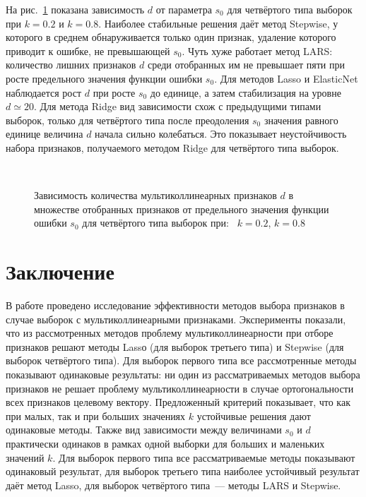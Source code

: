\documentclass[a4paper,12pt]{article}
\theoremstyle{plain}
\begin{document}
На рис.~\ref{fig:d_s0_sumort} показана зависимость $d$ от параметра $s_0$ для четвёртого типа выборок при $k = 0.2$ и $k = 0.8$. Наиболее стабильные решения даёт метод Stepwise, у которого в среднем обнаруживается только один признак, удаление которого приводит к ошибке, не превышающей $s_0$. Чуть хуже работает метод LARS: количество лишних признаков $d$ среди отобранных им не превышает пяти при росте предельного значения функции ошибки $s_0$. Для методов Lasso и ElasticNet наблюдается рост $d$ при росте $s_0$ до единице, а затем стабилизация на уровне $d \simeq 20$. Для метода Ridge вид зависимости схож с предыдущими типами выборок, только для четвёртого типа после преодоления $s_0$ значения равного единице величина $d$ начала сильно колебаться. Это показывает неустойчивость набора признаков, получаемого методом Ridge для четвёртого типа выборок. 

\begin{figure}[!h]
\centering
{}
~
\caption{Зависимость количества мультиколлинеарных признаков $d$ в множестве отобранных признаков от предельного значения функции ошибки $s_0$ для четвёртого типа выборок при:~ $k = 0.2$,  $k = 0.8$}
\label{fig:d_s0_sumort}
\end{figure}


\section{Заключение}
В работе проведено исследование эффективности методов выбора признаков в случае выборок с мультиколлинеарными признаками. Эксперименты показали, что из рассмотренных методов проблему мультиколлинеарности при отборе признаков решают методы Lassо (для выборок третьего типа) и Stepwise (для выборок четвёртого типа). Для выборок первого типа все рассмотренные методы показывают одинаковые результаты: ни один из рассматриваемых методов выбора признаков не решает проблему мультиколлинеарности в случае ортогональности всех признаков целевому вектору. Предложенный критерий показывает, что как при малых, так и при больших значениях $k$ устойчивые решения дают одинаковые методы. Также вид зависимости между величинами $s_0$ и $d$ практически одинаков в рамках одной выборки для больших и маленьких значений  $k$. Для выборок первого типа все рассматриваемые методы показывают одинаковый результат, для выборок третьего типа наиболее устойчивый результат даёт метод Lasso, для выборок четвёртого типа~--- методы LARS и Stepwise.
%
%
%
\renewcommand\refname{Литература}



\renewcommand\refname{References}

\end{document}
